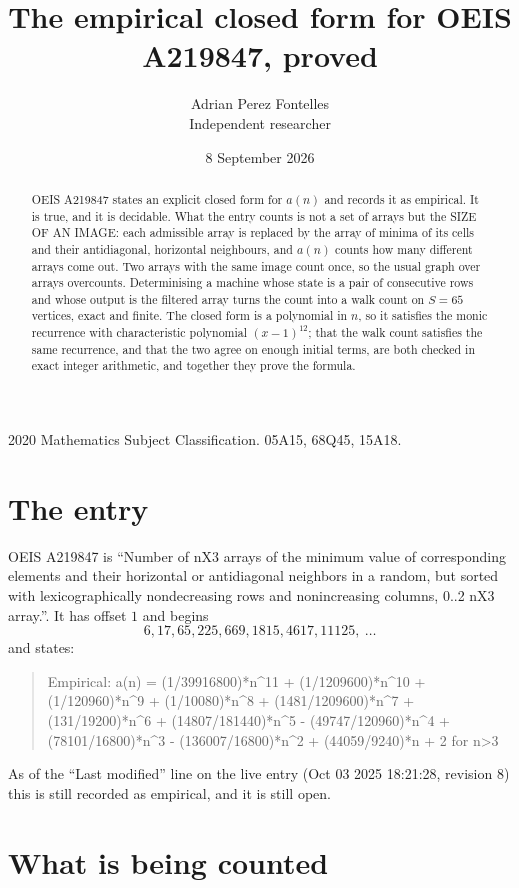 \documentclass[11pt,a4paper]{article}
\title{The empirical closed form for OEIS A219847, proved}
\author{Adrian Perez Fontelles\\ \small Independent researcher}
\date{8 September 2026}
\theoremstyle{plain}
\theoremstyle{definition}
\begin{document}
\maketitle

\begin{abstract}
OEIS A219847 states an explicit closed form for $a(n)$ and records it as empirical. It is true, and
it is decidable. What the entry counts is not a set of arrays but the SIZE OF AN IMAGE: each
admissible array is replaced by the array of minima of its cells and their antidiagonal, horizontal neighbours,
and $a(n)$ counts how many different arrays come out. Two arrays with the same image count
once, so the usual graph over arrays overcounts. Determinising a machine whose state is a pair
of consecutive rows and whose output is the filtered array turns the count into a walk count on
$S=65$ vertices, exact and finite. The closed form is a polynomial in $n$, so it satisfies the
monic recurrence with characteristic polynomial $(x-1)^{12}$; that the walk count
satisfies the same recurrence, and that the two agree on enough initial terms, are both checked
in exact integer arithmetic, and together they prove the formula.
\end{abstract}

\noindent\small 2020 Mathematics Subject Classification. 05A15, 68Q45, 15A18.\normalsize

\section{The entry}

OEIS A219847 is ``Number of nX3 arrays of the minimum value of corresponding elements and their horizontal or antidiagonal neighbors in a random, but sorted with lexicographically nondecreasing rows and nonincreasing columns, 0..2 nX3 array.''. It has offset $1$ and begins
\[
6, 17, 65, 225, 669, 1815, 4617, 11125,\ \dots
\]
and states:
\begin{quote}
Empirical: a(n) = (1/39916800)*n\^{}11 + (1/1209600)*n\^{}10 + (1/120960)*n\^{}9 + (1/10080)*n\^{}8 + (1481/1209600)*n\^{}7 + (131/19200)*n\^{}6 + (14807/181440)*n\^{}5 - (49747/120960)*n\^{}4 + (78101/16800)*n\^{}3 - (136007/16800)*n\^{}2 + (44059/9240)*n + 2 for n>3
\end{quote}
As of the ``Last modified'' line on the live entry (Oct 03 2025 18:21:28, revision 8)
this is still recorded as empirical, and it is still open.

\section{What is being counted}
\end{document}
